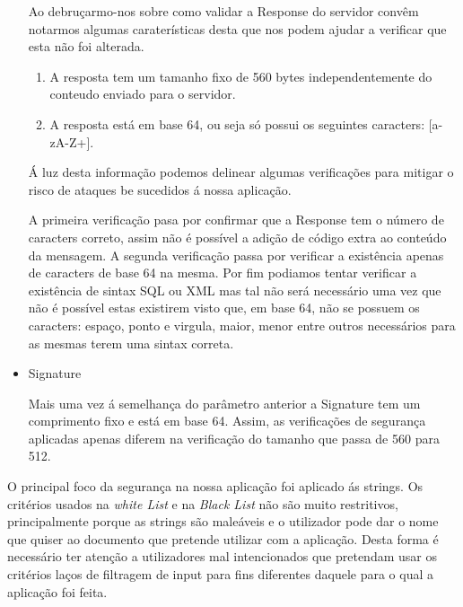 \begin{itemize}
\par Ao debruçarmo-nos sobre como validar a Response do servidor convêm notarmos algumas caraterísticas desta que nos podem ajudar a verificar que esta não foi alterada. 
\begin{enumerate}
	\item A resposta tem um tamanho fixo de 560 bytes independentemente do conteudo enviado para o servidor.
	\item A resposta está em base 64, ou seja só possui os seguintes caracters: [a-zA-Z+\/].
\end{enumerate}

\par Á luz desta informação podemos delinear algumas verificações para mitigar o risco de ataques be sucedidos á nossa aplicação.
\par A primeira verificação pasa por confirmar que a Response tem o número de caracters correto, assim não é possível a adição de código extra ao conteúdo da mensagem. A segunda verificação passa por verificar a existência apenas de caracters de base 64 na mesma. Por fim podiamos tentar verificar a existência de sintax SQL ou XML mas tal não será necessário uma vez que não é possível estas existirem visto que, em base 64, não se possuem os caracters: espaço, ponto e virgula, maior, menor entre outros necessários para as mesmas terem uma sintax correta.


\hfill\newline
\item Signature\newline

Mais uma vez á semelhança do parâmetro anterior a Signature tem um comprimento fixo e está em base 64. Assim, as verificações de segurança aplicadas apenas diferem na verificação do tamanho que passa de 560 para 512.


\end{itemize}


O principal foco da segurança na nossa aplicação foi aplicado ás strings. Os critérios usados na \textit{white List} e na \textit{Black List} não são muito restritivos, principalmente porque as strings são maleáveis e o utilizador pode dar o nome que quiser ao documento que pretende utilizar com a aplicação. Desta forma é necessário ter atenção a utilizadores mal intencionados que pretendam usar os critérios laços de filtragem de input para fins diferentes daquele para o qual a aplicação foi feita.\newline


